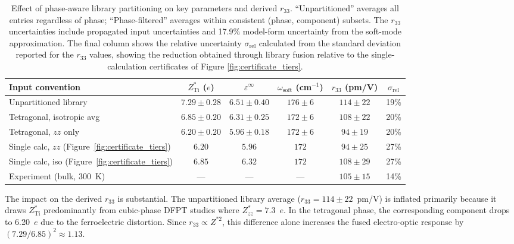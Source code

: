 \documentclass[prb,twocolumn,superscriptaddress,amsmath,amssymb,longbibliography]{revtex4-2}
\begin{document}
\begin{table}
\centering
\caption{Effect of phase-aware library partitioning on key parameters 
and derived $r_{33}$. ``Unpartitioned'' averages all entries regardless of 
phase; ``Phase-filtered'' averages within consistent (phase, component) 
subsets. The $r_{33}$ uncertainties include propagated input uncertainties 
and 17.9\% model-form uncertainty from the soft-mode approximation. The final column 
shows the relative uncertainty $\sigma_\text{rel}$ calculated from the standard deviation reported for the $r_{33}$ values, showing the reduction obtained through library fusion relative to the single-calculation certificates of Figure \ref{fig:certificate_tiers}.}
\label{tab:library_update}
\begin{tabular}{lccccc}
\toprule
Input convention & $Z^*_{\mathrm{Ti}}$ ($e$) & $\varepsilon^\infty$ & $\omega_{\mathrm{soft}}$ (cm$^{-1}$) & $r_{33}$ (pm/V) & $\sigma_{\mathrm{rel}}$ \\
\midrule
Unpartitioned library & \;\;$7.29 \pm 0.28$ \;\; & $6.51 \pm 0.40$ & $176 \pm 6$ & $114 \pm 22$ & 19\% \\
Tetragonal, isotropic avg & \;\;$6.85 \pm 0.20$ \;\;& $6.31 \pm 0.25$ & $172 \pm 6$ & $108 \pm 22$ & 20\% \\
Tetragonal, $zz$ only & \;\;$6.20 \pm 0.20$ \;\;& $5.96 \pm 0.18$ & $172 \pm 6$ & $94 \pm 19$ & 20\% \\
Single calc, $zz$ (Figure~\ref{fig:certificate_tiers}) & $6.20$ & $5.96$ & $172$ & $94 \pm 25$ & 27\% \\
Single calc, iso (Figure~\ref{fig:certificate_tiers}) & $6.85$ & $6.32$ & $172$ & $108 \pm 29$ & 27\% \\
\midrule
Experiment (bulk, 300~K) & --- & --- & --- & $105 \pm 15$ & 14\% \\
\bottomrule
\end{tabular}
\end{table}

The impact on the derived $r_{33}$ is substantial. The unpartitioned library 
average ($r_{33} = 114 \pm 22$~pm/V) is inflated primarily because it draws 
$Z^*_{\mathrm{Ti}}$ predominantly from cubic-phase DFPT 
studies \cite{Ghosez1998_BEC,Zhong1994_BTO,Veithen2005} where  $Z^*_{zz} = 7.3$~$e$. In the tetragonal phase, the 
 corresponding component drops to 6.20~$e$ due to the ferroelectric distortion. 
Since $r_{33} \propto Z^{*2}$, this difference alone increases the 
fused electro-optic response by  $(7.29/6.85)^2 \approx 1.13$.
\end{document}
